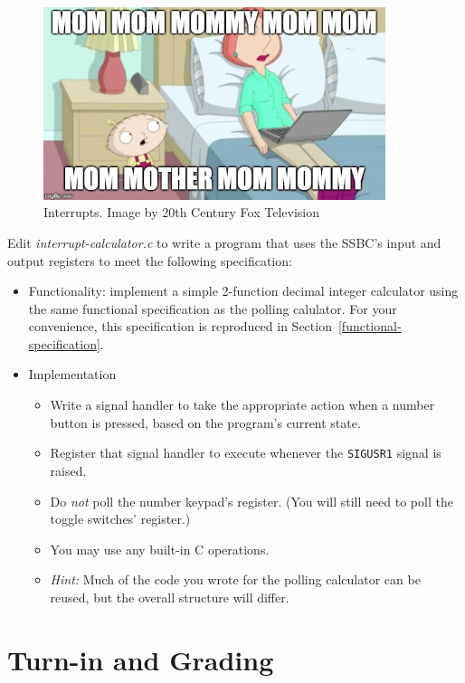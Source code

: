 \begin{figure}
    \centering
    \includegraphics[width=10cm]{MomMomMom}
    \caption{Interrupts. \tiny Image by 20th Century Fox Television}
\end{figure}

Edit \textit{interrupt-calculator.c} to write a program that uses the SSBC's
input and output registers to meet the following specification:

\begin{itemize}
    \item Functionality: implement a simple 2-function decimal integer
        calculator using the same functional specification as the polling
        calulator. For your convenience, this specification is reproduced in
        Section~\ref{functional-specification}.
    \item Implementation
    \begin{itemize}
        \item Write a signal handler to take the appropriate action when a
            number button is pressed, based on the program's current state.
        \item Register that signal handler to execute whenever the
            \texttt{SIGUSR1} signal is raised.
        \item Do \textit{not} poll the number keypad's register. (You will
            still need to poll the toggle switches' register.)
        \item You may use any built-in C operations.
        \item \textit{Hint: } Much of the code you wrote for the polling calculator can be reused, but the overall structure will differ.
    \end{itemize}
\end{itemize}








\section*{Turn-in and Grading}

